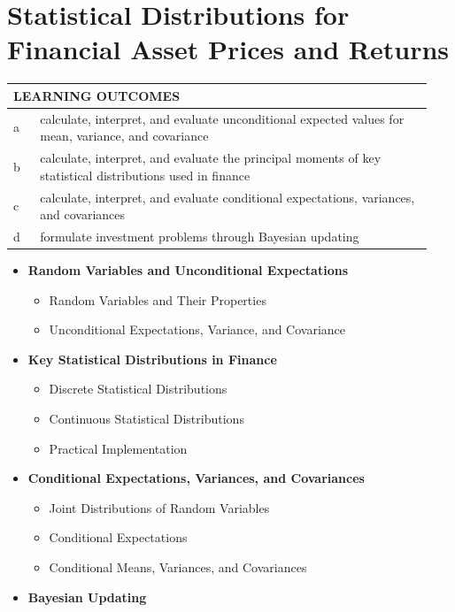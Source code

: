 \chapter{Statistical Distributions for Financial Asset Prices and Returns}
\label{chap:Statistical Distributions for Financial Asset Prices and Returns}

\begin{center}
\begin{tabular}{p{0.06\linewidth} | p{0.88\linewidth}}
	\toprule
	\multicolumn{2}{l}{\textbf{LEARNING OUTCOMES}} \\
	\midrule
	a & calculate, interpret, and evaluate unconditional expected values for mean, variance, and covariance \\
	\midrule
	b & calculate, interpret, and evaluate the principal moments of key statistical distributions used in finance \\
	\midrule
	c & calculate, interpret, and evaluate conditional expectations, variances, and covariances \\
	\midrule
	d & formulate investment problems through Bayesian updating \\
	\bottomrule
\end{tabular}
\end{center}

\vspace{1.5em}

\begin{itemize}
	\item[] \textbf{Random Variables and Unconditional Expectations}
	      \begin{itemize}
			\item[] Random Variables and Their Properties
			\item[] Unconditional Expectations, Variance, and Covariance
		  \end{itemize}
	\item[] \textbf{Key Statistical Distributions in Finance}
	      \begin{itemize}
			\item[] Discrete Statistical Distributions
			\item[] Continuous Statistical Distributions
			\item[] Practical Implementation
		  \end{itemize}
	\item[] \textbf{Conditional Expectations, Variances, and Covariances}
	      \begin{itemize}
			\item[] Joint Distributions of Random Variables
			\item[] Conditional Expectations
			\item[] Conditional Means, Variances, and Covariances
	      \end{itemize}
	\item[] \textbf{Bayesian Updating}
\end{itemize}

